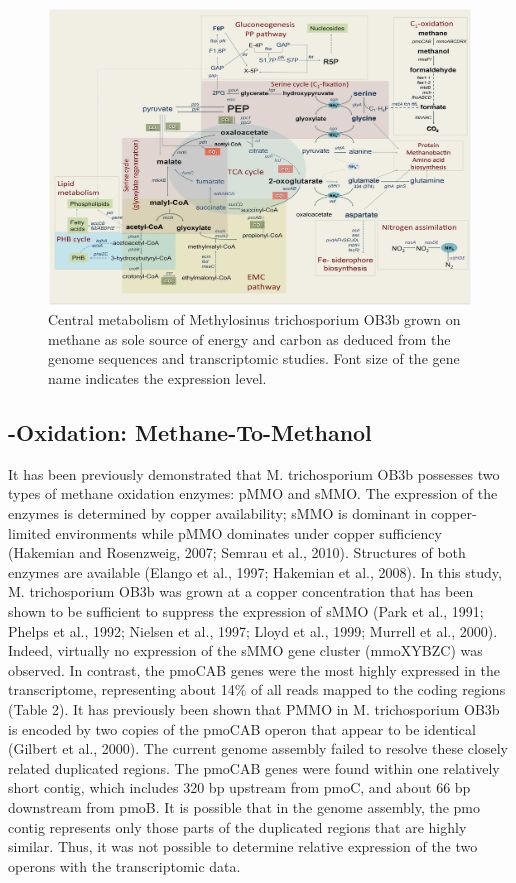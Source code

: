 \begin{figure}[H]
\centering
     \includegraphics[width=1.0\textwidth]{./tex/chapter1/figures/figure1.png}
     \begin{singlespace}
     \caption{Central metabolism of Methylosinus trichosporium OB3b grown on methane as sole source of energy and carbon as
        deduced from the genome sequences and transcriptomic studies.
        Font size of the gene name indicates the expression level.}
     \label{fig:A_metabolic_map}
     \end{singlespace}
\end{figure}


\subsection{-Oxidation: Methane-To-Methanol}
It has been previously demonstrated that M. trichosporium OB3b possesses two types of methane oxidation enzymes: pMMO and sMMO.
The expression of the enzymes is determined by copper availability; sMMO is dominant in copper-limited environments while pMMO dominates under copper sufficiency (Hakemian and Rosenzweig, 2007; Semrau et al., 2010).
Structures of both enzymes are available (Elango et al., 1997; Hakemian et al., 2008).
In this study, M. trichosporium OB3b was grown at a copper concentration that has been shown to be sufficient to suppress the expression of sMMO (Park et al., 1991; Phelps et al., 1992; Nielsen et al., 1997; Lloyd et al., 1999; Murrell et al., 2000).
Indeed, virtually no expression of the sMMO gene cluster (mmoXYBZC) was observed.
In contrast, the pmoCAB genes were the most highly expressed in the transcriptome, representing about 14\% of all reads mapped to the coding regions (Table 2).
It has previously been shown that PMMO in M. trichosporium OB3b is encoded by two copies of the pmoCAB operon that appear to be identical (Gilbert et al., 2000).
The current genome assembly failed to resolve these closely related duplicated regions.
The pmoCAB genes were found within one relatively short contig, which includes 320 bp upstream from pmoC, and about 66 bp downstream from pmoB.
It is possible that in the genome assembly, the pmo contig represents only those parts of the duplicated regions that are highly similar.
Thus, it was not possible to determine relative expression of the two operons with the transcriptomic data.

